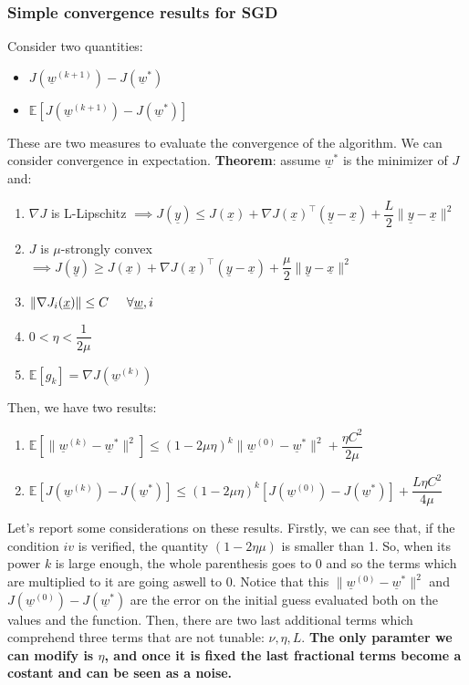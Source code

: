 \subsubsection{Simple convergence results for SGD}
Consider two quantities:
\begin{itemize}
    \item $J(\underline{w}^{(k+1)}) - J(\underline{w}^*)$
    \item $\mathbb{E}[J(\underline{w}^{(k+1)}) - J(\underline{w}^*)]$
\end{itemize}
These are two measures to evaluate the convergence of the algorithm. We can consider convergence in expectation.
\textbf{Theorem}: assume $\underline{w}^*$ is the minimizer of $J$ and:
\begin{enumerate}[i]
    \item $\nabla J$ is L-Lipschitz $\implies J(\underline{y}) \leq J(\underline{x}) + \nabla J(\underline{x})^\intercal (\underline{y} - \underline{x})  + \dfrac{L}{2}\|\underline{y} - \underline{x}\|^2$
    \item $J$ is $\mu$-strongly convex $\implies J(\underline{y}) \geq J(\underline{x}) + \nabla J(\underline{x})^\intercal (\underline{y} - \underline{x})  + \dfrac{\mu}{2}\|\underline{y} - \underline{x}\|^2$
    \item $\|\nabla J_i(\underline{x})\| \leq C \hspace{0.5cm} \forall\underline{w},i$
    \item $0 < \eta < \dfrac{1}{2\mu}$
    \item $\mathbb{E}[g_k] = \nabla J(\underline{w}^{(k)})$
\end{enumerate}
Then, we have two results:
\begin{enumerate}
    \item $\mathbb{E}[\|\underline{w}^{(k)} - \underline{w}^*\|^2] \leq (1-2\mu \eta)^k \|\underline{w}^{(0)} - \underline{w}^*\|^2 +\dfrac{\eta C^2}{2\mu}$
    \item $\mathbb{E}[J(\underline{w}^{(k)}) - J(\underline{w}^*)] \leq (1-2\mu \eta)^k [J(\underline{w}^{(0)}) - J(\underline{w}^*)] + \dfrac{L\eta C^2}{4\mu}$
\end{enumerate}
Let's report some considerations on these results. Firstly, we can see that, if the condition $iv$ is verified, the quantity $(1 - 2\eta\mu)$ is smaller than 1. So, when its power $k$ is large enough, the whole parenthesis goes to 0 and so the terms which are multiplied to it are going aswell to 0. Notice that this $\|\underline{w}^{(0)} - \underline{w}^*\|^2$ and $J(\underline{w}^{(0)}) - J(\underline{w}^*)$ are the error on the initial guess evaluated both on the values and the function. Then, there are two last additional terms which comprehend three terms that are not tunable: $\nu, \eta, L$. \textbf{The only paramter we can modify is $\eta$, and once it is fixed the last fractional terms become a costant and can be seen as a noise. }\\

